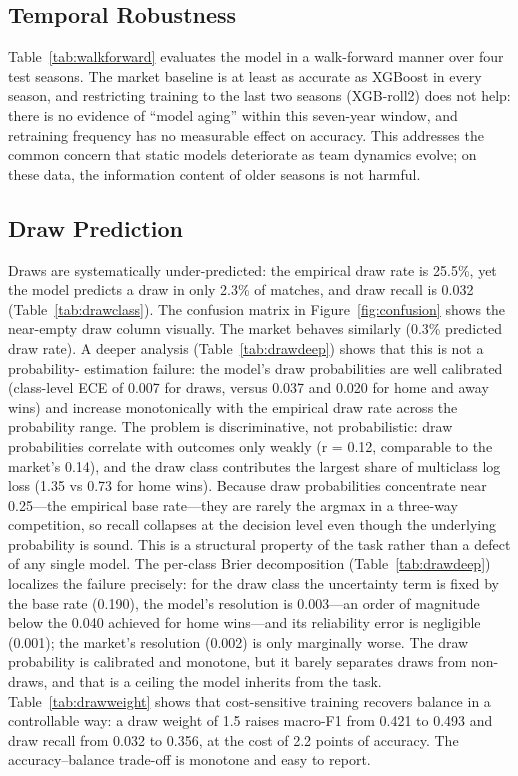 \subsection{Temporal Robustness}


Table~\ref{tab:walkforward} evaluates the model in a walk-forward
manner over four test seasons. The market baseline is at least as
accurate as XGBoost in every season, and restricting training to the
last two seasons (XGB-roll2) does not help: there is no evidence of
``model aging'' within this seven-year window, and retraining
frequency has no measurable effect on accuracy. This addresses the
common concern that static models deteriorate as team dynamics
evolve; on these data, the information content of older seasons is not
harmful.

\subsection{Draw Prediction}




Draws are systematically under-predicted: the empirical draw rate is
25.5\%, yet the model predicts a draw in only 2.3\% of matches, and
draw recall is 0.032 (Table~\ref{tab:drawclass}). The confusion
matrix in Figure~\ref{fig:confusion} shows the near-empty draw
column visually. The market behaves
similarly (0.3\% predicted draw rate). A deeper analysis
(Table~\ref{tab:drawdeep}) shows that this is not a probability-
estimation failure: the model's draw probabilities are well
calibrated (class-level ECE of 0.007 for draws, versus 0.037 and
0.020 for home and away wins) and increase monotonically with the
empirical draw rate across the probability range. The problem is
discriminative, not probabilistic: draw probabilities correlate with
outcomes only weakly (r = 0.12, comparable to the market's 0.14),
and the draw class contributes the largest share of multiclass log
loss (1.35 vs 0.73 for home wins). Because draw probabilities
concentrate near 0.25---the empirical base rate---they are rarely the
argmax in a three-way competition, so recall collapses at the
decision level even though the underlying probability is sound. This
is a structural property of the task rather than a defect of any
single model. The per-class Brier decomposition (Table~\ref{tab:drawdeep})
localizes the failure precisely: for the draw class the uncertainty
term is fixed by the base rate (0.190), the model's resolution is
0.003---an order of magnitude below the 0.040 achieved for home
wins---and its reliability error is negligible (0.001); the market's
resolution (0.002) is only marginally worse. The draw probability is
calibrated and monotone, but it barely separates draws from
non-draws, and that is a ceiling the model inherits from the task.
Table~\ref{tab:drawweight} shows that cost-sensitive
training recovers balance in a controllable way: a draw weight of
1.5 raises macro-F1 from 0.421 to 0.493 and draw recall from 0.032
to 0.356, at the cost of 2.2 points of accuracy. The accuracy--balance
trade-off is monotone and easy to report.


